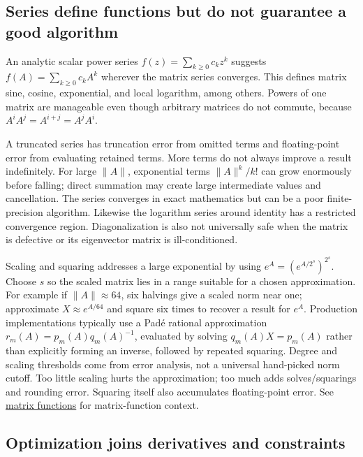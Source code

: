 \subsection{Series define functions but do not guarantee a good algorithm}\label{series-define-functions-but-do-not-guarantee-a-good-algorithm}

An analytic scalar power series \(f(z)=\sum_{k\ge0}c_kz^k\) suggests \(f(A)=\sum_{k\ge0}c_kA^k\) wherever the matrix series converges. This defines matrix sine, cosine, exponential, and local logarithm, among others. Powers of one matrix are manageable even though arbitrary matrices do not commute, because \(A^iA^j=A^{i+j}=A^jA^i\).

A truncated series has truncation error from omitted terms and floating-point error from evaluating retained terms. More terms do not always improve a result indefinitely. For large \(\|A\|\), exponential terms \(\|A\|^k/k!\) can grow enormously before falling; direct summation may create large intermediate values and cancellation. The series converges in exact mathematics but can be a poor finite-precision algorithm. Likewise the logarithm series around identity has a restricted convergence region. Diagonalization is also not universally safe when the matrix is defective or its eigenvector matrix is ill-conditioned.

Scaling and squaring addresses a large exponential by using \(e^A=(e^{A/2^s})^{2^s}\). Choose \(s\) so the scaled matrix lies in a range suitable for a chosen approximation. For example if \(\|A\|\approx64\), six halvings give a scaled norm near one; approximate \(X\approx e^{A/64}\) and square six times to recover a result for \(e^A\). Production implementations typically use a Padé rational approximation \(r_m(A)=p_m(A)q_m(A)^{-1}\), evaluated by solving \(q_m(A)X=p_m(A)\) rather than explicitly forming an inverse, followed by repeated squaring. Degree and scaling thresholds come from error analysis, not a universal hand-picked norm cutoff. Too little scaling hurts the approximation; too much adds solves/squarings and rounding error. Squaring itself also accumulates floating-point error. See \hyperref[02-foundations-ii-ch026]{matrix functions} for matrix-function context.

\subsection{Optimization joins derivatives and constraints}\label{optimization-joins-derivatives-and-constraints}

